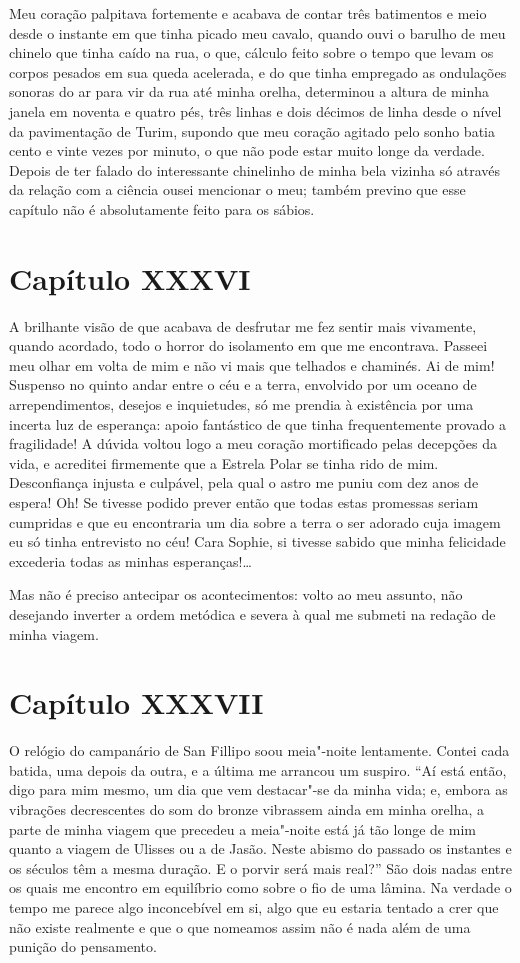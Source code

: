  Meu coração palpitava fortemente e acabava de contar três batimentos e
meio desde o instante em que tinha picado meu cavalo, quando ouvi o
barulho de meu chinelo que tinha caído na rua, o que, cálculo feito
sobre o tempo que levam os corpos pesados em sua queda acelerada, e do
que tinha empregado as ondulações sonoras do ar para vir da rua até
minha orelha, determinou a altura de minha janela em noventa e quatro
pés, três linhas e dois décimos de linha desde o nível da pavimentação
de Turim, supondo que meu coração agitado pelo sonho batia cento e
vinte vezes por minuto, o que não pode estar muito longe da verdade.
Depois de ter falado do interessante chinelinho de minha bela vizinha
só através da relação com a ciência ousei mencionar o meu; também
previno que esse capítulo não é absolutamente feito para os sábios.

\section*{Capítulo XXXVI}

 A brilhante visão de que acabava de desfrutar me fez sentir mais
vivamente, quando acordado, todo o horror do isolamento em que me
encontrava. Passeei meu olhar em volta de mim e não vi mais que
telhados e chaminés. Ai de mim! Suspenso no quinto andar entre o céu e
a terra, envolvido por um oceano de arrependimentos, desejos e
inquietudes, só me prendia à existência por uma incerta luz de
esperança: apoio fantástico de que tinha frequentemente provado a
fragilidade! A dúvida voltou logo a meu coração mortificado pelas
decepções da vida, e acreditei firmemente que a Estrela Polar se tinha
rido de mim. Desconfiança injusta e culpável, pela qual o astro me
puniu com dez anos de espera! Oh! Se tivesse podido prever então que
todas estas promessas seriam cumpridas e que eu encontraria um dia
sobre a terra o ser adorado cuja imagem eu só tinha entrevisto no céu!
Cara Sophie, si tivesse sabido que minha felicidade excederia todas as
minhas esperanças!\ldots

 Mas não é preciso antecipar os acontecimentos: volto ao meu assunto,
não desejando inverter a ordem metódica e severa à qual me submeti na
redação de minha viagem.

\section*{Capítulo XXXVII}

 O relógio do campanário de San Fillipo soou meia"-noite lentamente.
Contei cada batida, uma depois da outra, e a última me arrancou um
suspiro. ``Aí está então, digo para mim mesmo, um dia que vem
destacar"-se da minha vida; e, embora as vibrações decrescentes do som
do bronze vibrassem ainda em minha orelha, a parte de minha viagem que
precedeu a meia"-noite está já tão longe de mim quanto a viagem de
Ulisses ou a de Jasão. Neste abismo do passado os instantes e os
séculos têm a mesma duração. E o porvir será mais real?'' São dois nadas
entre os quais me encontro em equilíbrio como sobre o fio de uma
lâmina. Na verdade o tempo me parece algo inconcebível em si, algo que
eu estaria tentado a crer que não existe realmente e que o que nomeamos
assim não é nada além de uma punição do pensamento.  

